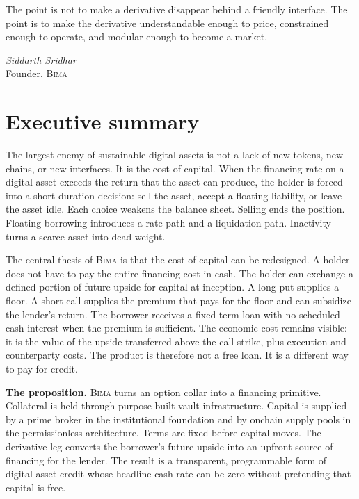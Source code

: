 \documentclass[11pt,oneside]{article}
\newcommand{\Bima}{\textsc{Bima}}
\begin{document}
The point is not to make a derivative disappear behind a friendly interface. The point is to make the derivative understandable enough to price, constrained enough to operate, and modular enough to become a market.

\begin{flushright}
\emph{Siddarth Sridhar}\\
Founder, \Bima{}
\end{flushright}

\newpage

\section{Executive summary}

The largest enemy of sustainable digital assets is not a lack of new tokens, new chains, or new interfaces. It is the cost of capital. When the financing rate on a digital asset exceeds the return that the asset can produce, the holder is forced into a short duration decision: sell the asset, accept a floating liability, or leave the asset idle. Each choice weakens the balance sheet. Selling ends the position. Floating borrowing introduces a rate path and a liquidation path. Inactivity turns a scarce asset into dead weight.

The central thesis of \Bima{} is that the cost of capital can be redesigned. A holder does not have to pay the entire financing cost in cash. The holder can exchange a defined portion of future upside for capital at inception. A long put supplies a floor. A short call supplies the premium that pays for the floor and can subsidize the lender's return. The borrower receives a fixed-term loan with no scheduled cash interest when the premium is sufficient. The economic cost remains visible: it is the value of the upside transferred above the call strike, plus execution and counterparty costs. The product is therefore not a free loan. It is a different way to pay for credit.

\begin{thesisbox}
\textbf{The proposition.} \Bima{} turns an option collar into a financing primitive. Collateral is held through purpose-built vault infrastructure. Capital is supplied by a prime broker in the institutional foundation and by onchain supply pools in the permissionless architecture. Terms are fixed before capital moves. The derivative leg converts the borrower's future upside into an upfront source of financing for the lender. The result is a transparent, programmable form of digital asset credit whose headline cash rate can be zero without pretending that capital is free.
\end{thesisbox}
\end{document}
